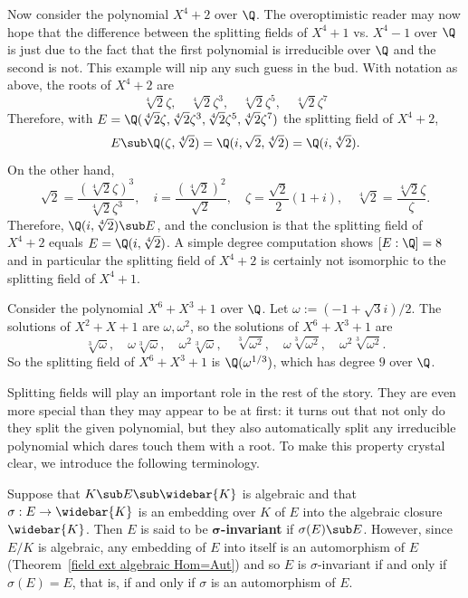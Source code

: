 \begin{example}\label{field splitting of x^4+2}
Now consider the polynomial $X^4+2$ over $\Q$. The overoptimistic reader may now hope that the difference between the splitting fields of $X^4+1$ vs. $X^4-1$ over $\Q$ is just due to the fact that the first polynomial is irreducible over $\Q$ and the second is not. This example will nip any such guess in the bud. With notation as above, the roots of $X^4+2$ are
\[\sqrt[4]{2}\zeta,\quad \sqrt[4]{2}\zeta^3,\quad \sqrt[4]{2}\zeta^5,\quad \sqrt[4]{2}\zeta^7\]
Therefore, with $E=\Q(\sqrt[4]{2}\zeta,\sqrt[4]{2}\zeta^3,\sqrt[4]{2}\zeta^5,\sqrt[4]{2}\zeta^7)$ the splitting field of $X^4+2$,
\[E\sub\Q(\zeta,\sqrt[4]{2})=\Q(i,\sqrt{2},\sqrt[4]{2})=\Q(i,\sqrt[4]{2}).\]
On the other hand, 
\[\sqrt{2}=\frac{(\sqrt[4]{2}\zeta)^3}{\sqrt[4]{2}\zeta^3},\quad i=\frac{(\sqrt[4]{2})^2}{\sqrt{2}},\quad \zeta=\frac{\sqrt{2}}{2}(1+i),\quad\sqrt[4]{2}=\frac{\sqrt[4]{2}\zeta}{\zeta}.\]
Therefore, $\Q(i,\sqrt[4]{2})\sub E$, and the conclusion is that the splitting field of $X^4+2$ equals $E=\Q(i,\sqrt[4]{2})$. A simple degree
computation shows $[E:\Q]=8$ and in particular the splitting field of $X^4+2$ is certainly not isomorphic to the splitting field of $X^4+1$.
\end{example}
\begin{example}\label{field splitting x^6+x^3+1}
Consider the polynomial $X^6+X^3+1$ over $\Q$. Let $\omega:=(-1+\sqrt{3}i)/2$. The solutions of $X^2+X+1$ are $\omega,\omega^2$, so the solutions of $X^6+X^3+1$ are
\[\sqrt[3]{\omega},\quad\omega\sqrt[3]{\omega},\quad\omega^2\sqrt[3]{\omega},\quad\sqrt[3]{\omega^2},\quad\omega\sqrt[3]{\omega^2},\quad\omega^2\sqrt[3]{\omega^2}.\]
So the splitting field of $X^6+X^3+1$ is $\Q(\omega^{1/3})$, which has degree $9$ over $\Q$.
\end{example}
Splitting fields will play an important role in the rest of the story. They are even more special than they may appear to be at first: it turns out that not only do they split the given polynomial, but they also automatically split any irreducible polynomial which dares touch them with a root. To make this property crystal clear, we introduce the following terminology.\par
Suppose that $K\sub E\sub\widebar{K}$ is algebraic and that $\sigma:E\to\widebar{K}$ is an embedding over $K$ of $E$ into the algebraic closure $\widebar{K}$. Then $E$ is said to be \textbf{$\bm{\sigma}$-invariant} if $\sigma(E)\sub E$. However, since $E/K$ is algebraic, any embedding of $E$ into itself is an automorphism of $E$ (Theorem~\ref{field ext algebraic Hom=Aut}) and so $E$ is $\sigma$-invariant if and only if $\sigma(E)=E$, that is, if and only if $\sigma$ is an automorphism of $E$.\par
